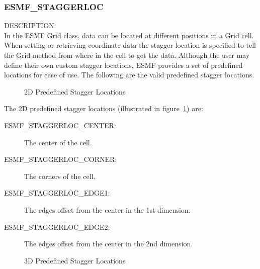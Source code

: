 \subsubsection{ESMF\_STAGGERLOC}
\label{const:staggerloc}

 {\sf DESCRIPTION:\\}
 In the ESMF Grid class, data can be located at different positions in a
 Grid cell.  When setting or retrieving coordinate data the stagger location is
 specified to tell the Grid method  from where in the cell to get the data. 
 Although the user may define their own custom stagger locations, 
 ESMF provides a set of predefined locations for ease of use. The
following are the valid predefined stagger locations. 

\medskip

\begin{center}
\begin{figure}
\center
{}
\caption{2D Predefined Stagger Locations}
\label{fig:gridstaggerloc2d}
\end{figure}
\end{center}

The 2D predefined stagger locations (illustrated in figure~\ref{fig:gridstaggerloc2d}) are:\\
\begin{description}
\item [ESMF\_STAGGERLOC\_CENTER:] The center of the cell.
\item [ESMF\_STAGGERLOC\_CORNER:] The corners of the cell.
\item [ESMF\_STAGGERLOC\_EDGE1:] The edges offset from the center in the 1st dimension.
\item [ESMF\_STAGGERLOC\_EDGE2:] The edges offset from the center in the 2nd dimension.
\end{description}

\medskip

\begin{center}
\begin{figure}
\center
{}
\caption{3D Predefined Stagger Locations}
\label{fig:gridstaggerloc3d}
\end{figure}
\end{center}

